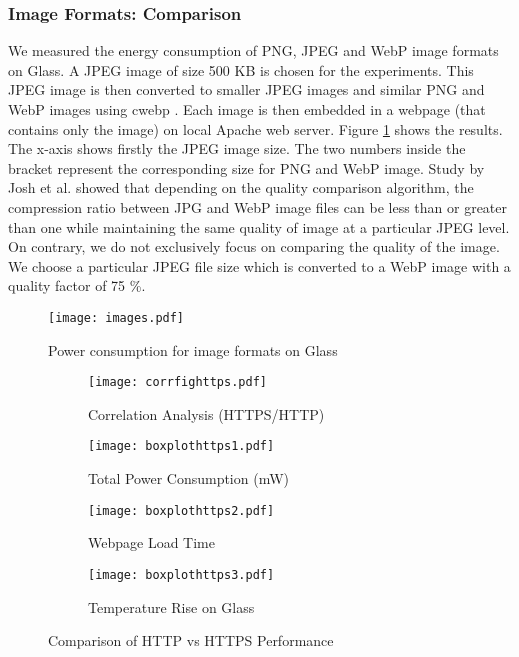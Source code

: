 \documentclass{sig-alternate-10pt}
\newlength\figwidth
\begin{document}
\subsubsection{Image Formats: Comparison}


We measured the energy consumption of PNG, JPEG and WebP  image formats on Glass. A JPEG image of size 500 KB is chosen for the experiments.  This JPEG image is then converted to smaller JPEG images and similar  PNG and WebP images using cwebp  \cite{cwebp}.  Each image is then embedded in a webpage (that contains only the image) on  local Apache web server.  Figure \ref{fig-images} shows the results. The x-axis shows firstly the JPEG image size. The two numbers inside the bracket represent the corresponding size for PNG and WebP image. Study by Josh et al. \cite{josh} showed that  depending on the quality comparison algorithm, the compression  ratio between JPG and WebP image files can be less than or greater than one while  maintaining  the same  quality of image at a particular JPEG level. On contrary, we  do not exclusively focus  on comparing the quality of the image.  We choose a particular JPEG file size which is  converted to a WebP image with a quality factor of 75 \%.  

\begin{figure}[!h]
  \centering
  \texttt{[image: images.pdf]}
\caption{Power consumption for image formats on Glass}
\label{fig-images}
\end{figure} 



\begin{figure*}[ht]
\centering
\begin{subfigure}{\figwidth}
\texttt{[image: corrfighttps.pdf]}
\caption{Correlation Analysis (HTTPS/HTTP)}
\label{fig-corrfighttps}
\end{subfigure}\begin{subfigure}{\figwidth}
     \texttt{[image: boxplothttps1.pdf]}
     \caption{Total Power Consumption (mW)}
     \label{fig-boxplothttps1}
\end{subfigure}
\begin{subfigure}{\figwidth}
	\texttt{[image: boxplothttps2.pdf]}
    \caption{Webpage Load Time}
    \label{fig-boxplothttps2}
\end{subfigure}\begin{subfigure}{\figwidth}
     \texttt{[image: boxplothttps3.pdf]}
     \caption{Temperature Rise on Glass}
     \label{fig-boxplothttps3}
     \end{subfigure}
\caption{Comparison of HTTP vs HTTPS Performance}
\label{fig-https}
\end{figure*}
 
\end{document}
